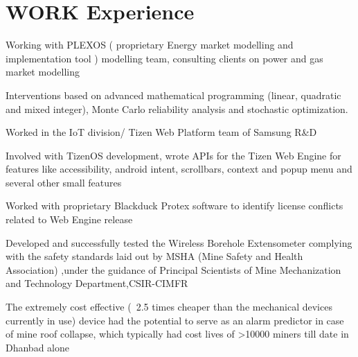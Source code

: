 \documentclass[]{deedy-resume-openfont}
\begin{document}
\begin{minipage}[t]{0.66\textwidth} 


\section{WORK Experience}
\vspace{\topsep}
\vspace{\topsep}
\begin{tightemize}

\justifying
\item Working with PLEXOS ( proprietary Energy market modelling and implementation tool ) modelling team, consulting clients on power and gas market modelling
\item Interventions based on advanced mathematical programming (linear, quadratic and mixed integer), Monte Carlo reliability analysis and stochastic optimization.
\end{tightemize}
\sectionsep

\vspace{\topsep}
\begin{tightemize}
\justifying
\item Worked in the IoT division/ Tizen Web Platform team of Samsung R\&D
\item Involved with TizenOS development, wrote APIs for the Tizen Web Engine for features like accessibility, android intent, scrollbars, context and popup menu and several other small features
\item Worked with proprietary Blackduck Protex software to identify license conflicts related to Web Engine release
\end{tightemize}
\sectionsep

\begin{tightemize}
\justifying
\item Developed and successfully tested the Wireless Borehole Extensometer complying with the safety standards laid out by MSHA (Mine Safety and Health Association) ,under the guidance of Principal Scientists of Mine Mechanization and Technology Department,CSIR-CIMFR
\item The extremely cost effective (~2.5 times cheaper than the mechanical devices currently in use) device had the potential to serve as an alarm predictor in case of mine roof collapse, which typically had cost lives of >10000 miners till date in Dhanbad alone
\end{tightemize}
\sectionsep


\end{minipage}
\end{document}
